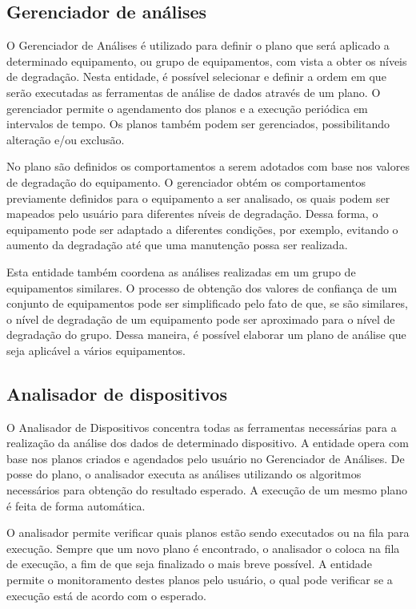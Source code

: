 \subsection{Gerenciador de análises}

O Gerenciador de Análises é utilizado para definir o plano que será aplicado a determinado
equipamento, ou grupo de equipamentos, com vista a obter os níveis de degradação.
Nesta entidade, é possível selecionar e definir a ordem em que serão executadas as ferramentas de
análise de dados através de um plano. O gerenciador permite o agendamento dos planos e a execução
periódica em intervalos de tempo. Os planos também podem ser gerenciados, possibilitando alteração
e/ou exclusão.

No plano são definidos os comportamentos a serem adotados com base nos valores de degradação do
equipamento. O gerenciador obtém os comportamentos previamente definidos para o equipamento a ser
analisado, os quais podem ser mapeados pelo usuário para diferentes níveis de degradação. Dessa
forma, o equipamento pode ser adaptado a diferentes condições, por exemplo, evitando o aumento da
degradação até que uma manutenção possa ser realizada.

Esta entidade também coordena as análises realizadas em um grupo de equipamentos similares. O
processo de obtenção dos valores de confiança de um conjunto de equipamentos pode ser simplificado
pelo fato de que, se são similares, o nível de degradação de um equipamento pode ser aproximado para
o nível de degradação do grupo. Dessa maneira, é possível elaborar um plano de análise que seja
aplicável a vários equipamentos.


\subsection{Analisador de dispositivos}

O Analisador de Dispositivos concentra todas as ferramentas necessárias para a realização da análise
dos dados de determinado dispositivo. A entidade opera com base nos planos criados e agendados pelo
usuário no Gerenciador de Análises. De posse do plano, o analisador
executa as análises utilizando os algoritmos necessários para obtenção do resultado esperado. A
execução de um mesmo plano é feita de forma automática.

O analisador permite verificar quais planos estão sendo executados ou na fila para execução. Sempre
que um novo plano é encontrado, o analisador o coloca na fila de execução, a fim de que seja
finalizado o mais breve possível. A entidade permite o monitoramento destes planos pelo usuário, o
qual pode verificar se a execução está de acordo com o esperado.


